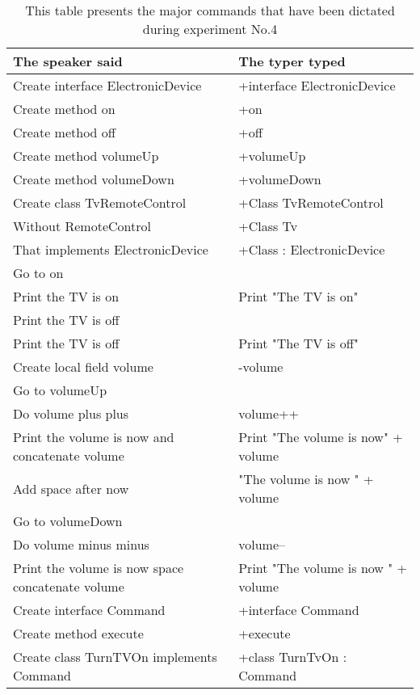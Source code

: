 \begin{table}[H]
	\begin{tabular}{|p{10cm}|p{6cm}|}
		\hline
		\rowcolor[HTML]{9B9B9B} 
		{\color[HTML]{000000} The speaker said} & {\color[HTML]{000000} The typer typed} \\ \hline
		Create interface ElectronicDevice & +interface ElectronicDevice \\ \hline
		Create method on & +on \\ \hline
		Create method off & +off \\ \hline
		Create method volumeUp & +volumeUp \\ \hline
		Create method volumeDown & +volumeDown \\ \hline
		Create class TvRemoteControl & +Class TvRemoteControl \\ \hline
		Without RemoteControl & +Class Tv \\ \hline
		That implements ElectronicDevice & +Class : ElectronicDevice \\ \hline
		Go to on &  \\ \hline
		Print the TV is on & Print "The TV is on" \\ \hline
		Print the TV is off & \\ \hline
		Print the TV is off & Print "The TV is off" \\ \hline
		Create local field volume & -volume \\ \hline
		Go to volumeUp &  \\ \hline
		Do volume plus plus &  volume++ \\ \hline
		Print the volume is now and concatenate volume  &  Print "The volume is now" + volume \\ \hline
		Add space after now & "The volume is now " + volume \\ \hline
		Go to volumeDown & \\ \hline
		Do volume minus minus & volume-- \\ \hline
		Print the volume is now space concatenate volume & Print "The volume is now " + volume \\ \hline
		Create interface Command & +interface Command \\ \hline
		Create method execute & +execute \\ \hline
		Create class TurnTVOn implements Command & +class TurnTvOn : Command\\ \hline
	\end{tabular}
	\caption{This table presents the major commands that have been dictated during experiment No.4}
\label{tab4}
		\end{table}
